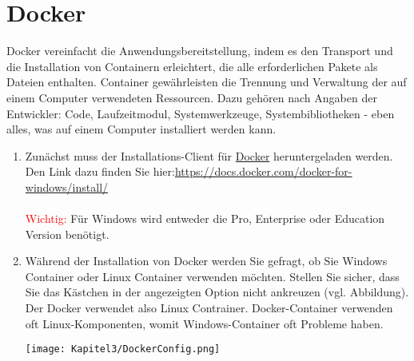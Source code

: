 \section{Docker}\label{DockerInstal}

Docker vereinfacht die Anwendungsbereitstellung, indem es den Transport und die Installation von Containern erleichtert, die alle erforderlichen Pakete als Dateien enthalten. Container gewährleisten die Trennung und Verwaltung der auf einem Computer verwendeten Ressourcen. Dazu gehören nach Angaben der Entwickler: Code, Laufzeitmodul, Systemwerkzeuge, Systembibliotheken - eben alles, was auf einem Computer installiert werden kann.
\begin{enumerate}
    \item Zunächst muss der Installations-Client für \href{https://docs.docker.com/docker-for-windows/install/}{Docker} heruntergeladen werden. Den Link dazu finden Sie hier:\href{https://docs.docker.com/docker-for-windows/install/}{https://docs.docker.com/docker-for-windows/install/}\\\\\textcolor{red}{Wichtig:} Für Windows wird entweder die Pro, Enterprise oder Education Version benötigt.
    
    \item Während der Installation von Docker werden Sie gefragt, ob Sie Windows Container oder Linux Container verwenden möchten. Stellen Sie sicher, dass Sie das Kästchen in der angezeigten Option nicht ankreuzen (vgl. Abbildung). Der Docker verwendet also Linux Contrainer. Docker-Container verwenden oft Linux-Komponenten, womit Windows-Container oft Probleme haben.\\
    \begin{center}
        \begin{minipage}[t]{0.5\textwidth}
            \centering
            \texttt{[image: Kapitel3/DockerConfig.png]}
            \label{ContainerConfig}
        \end{minipage}
    \end{center}


\end{enumerate}
